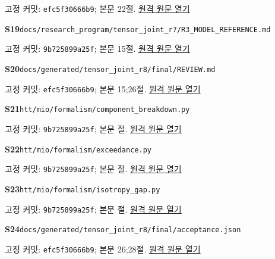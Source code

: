 \documentclass[11pt,a4paper]{article}
\begin{document}
{\small 고정 커밋: \texttt{efc5f30666b9}; 본문 22절. \href{https://github.com/cosmosapjw-quantum/htt_base/blob/efc5f30666b96782f946375551f0068bb3a30f74/docs/generated/tensor_joint_r8/jet_images/README.md}{원격 원문 열기}}\par
\hypertarget{src:S19}{}\textbf{S19}\quad \nolinkurl{docs/research_program/tensor_joint_r7/R3_MODEL_REFERENCE.md}\par
{\small 고정 커밋: \texttt{9b725899a25f}; 본문 15절. \href{https://github.com/cosmosapjw-quantum/htt_base/blob/9b725899a25fa410e7c3686ce36afaa667d14646/docs/research_program/tensor_joint_r7/R3_MODEL_REFERENCE.md}{원격 원문 열기}}\par
\hypertarget{src:S20}{}\textbf{S20}\quad \nolinkurl{docs/generated/tensor_joint_r8/final/REVIEW.md}\par
{\small 고정 커밋: \texttt{efc5f30666b9}; 본문 15;26절. \href{https://github.com/cosmosapjw-quantum/htt_base/blob/efc5f30666b96782f946375551f0068bb3a30f74/docs/generated/tensor_joint_r8/final/REVIEW.md}{원격 원문 열기}}\par
\hypertarget{src:S21}{}\textbf{S21}\quad \nolinkurl{htt/mio/formalism/component_breakdown.py}\par
{\small 고정 커밋: \texttt{9b725899a25f}; 본문 절. \href{https://github.com/cosmosapjw-quantum/htt_base/blob/9b725899a25fa410e7c3686ce36afaa667d14646/htt/mio/formalism/component_breakdown.py}{원격 원문 열기}}\par
\hypertarget{src:S22}{}\textbf{S22}\quad \nolinkurl{htt/mio/formalism/exceedance.py}\par
{\small 고정 커밋: \texttt{9b725899a25f}; 본문 절. \href{https://github.com/cosmosapjw-quantum/htt_base/blob/9b725899a25fa410e7c3686ce36afaa667d14646/htt/mio/formalism/exceedance.py}{원격 원문 열기}}\par
\hypertarget{src:S23}{}\textbf{S23}\quad \nolinkurl{htt/mio/formalism/isotropy_gap.py}\par
{\small 고정 커밋: \texttt{9b725899a25f}; 본문 절. \href{https://github.com/cosmosapjw-quantum/htt_base/blob/9b725899a25fa410e7c3686ce36afaa667d14646/htt/mio/formalism/isotropy_gap.py}{원격 원문 열기}}\par
\hypertarget{src:S24}{}\textbf{S24}\quad \nolinkurl{docs/generated/tensor_joint_r8/final/acceptance.json}\par
{\small 고정 커밋: \texttt{efc5f30666b9}; 본문 26;28절. \href{https://github.com/cosmosapjw-quantum/htt_base/blob/efc5f30666b96782f946375551f0068bb3a30f74/docs/generated/tensor_joint_r8/final/acceptance.json}{원격 원문 열기}}\par
\end{document}

